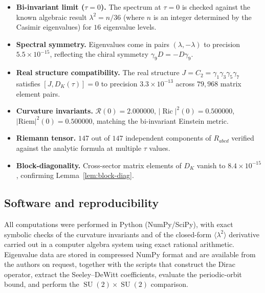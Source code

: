 \documentclass[12pt]{article}
\theoremstyle{definition}
\theoremstyle{remark}
\DeclareMathOperator{\Ric}{Ric}
\DeclareMathOperator{\SU}{SU}
\begin{document}
\begin{itemize}
\item \textbf{Bi-invariant limit ($\tau = 0$).}  The spectrum at
  $\tau = 0$ is checked against the known algebraic result
  $\lambda^2 = n/36$ (where $n$ is an integer determined by the
  Casimir eigenvalues) for $16$ eigenvalue levels.

\item \textbf{Spectral symmetry.}  Eigenvalues come in pairs
  $(\lambda, -\lambda)$ to precision $5.5 \times 10^{-15}$,
  reflecting the chiral symmetry $\gamma_9 D = -D \gamma_9$.

\item \textbf{Real structure compatibility.}  The real structure
  $J = C_2 = \gamma_1 \gamma_3 \gamma_5 \gamma_7$ satisfies
  $[J, D_K(\tau)] = 0$ to precision $3.3 \times 10^{-13}$ across
  $79{,}968$ matrix element pairs.

\item \textbf{Curvature invariants.}  $\mathcal{R}(0) = 2.000000$,
  $|\Ric|^2(0) = 0.500000$, $|\mathrm{Riem}|^2(0) = 0.500000$,
  matching the bi-invariant Einstein metric.

\item \textbf{Riemann tensor.}  $147$ out of $147$ independent
  components of $R_{abcd}$ verified against the analytic formula at
  multiple $\tau$ values.

\item \textbf{Block-diagonality.}  Cross-sector matrix elements of
  $D_K$ vanish to $8.4 \times 10^{-15}$, confirming
  Lemma~\ref{lem:block-diag}.
\end{itemize}


\subsection{Software and reproducibility}

All computations were performed in Python (NumPy/SciPy), with exact
symbolic checks of the curvature invariants and of the closed-form
$\langle\lambda^2\rangle$ derivative carried out in a computer algebra
system using exact rational arithmetic.  Eigenvalue data are stored in
compressed NumPy format and are available from the authors on request,
together with the scripts that construct the Dirac operator, extract
the Seeley--DeWitt coefficients, evaluate the periodic-orbit bound, and
perform the $\SU(2)\times\SU(2)$ comparison.




\end{document}
